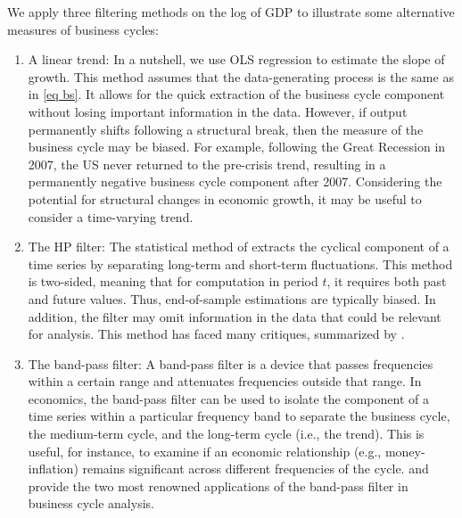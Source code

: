 \documentclass[a4paper,12pt]{article}%
\begin{document}
%


We apply three filtering methods on the log of GDP to illustrate some
alternative measures of business cycles:

\begin{enumerate}
\item \textsf{A linear trend:} In a nutshell, we use OLS regression to
estimate the slope of growth. This method assumes that the data-generating
process is the same as in \autoref{eq bs}. It allows for the quick extraction
of the business cycle component without losing important information in the
data. However, if output permanently shifts following a structural break,
then the measure of the business cycle may be biased. For example, following
the Great Recession in 2007, the US never returned to the pre-crisis trend,
resulting in a permanently negative business cycle component after 2007.
Considering the potential for structural changes in economic growth, it may
be useful to consider a time-varying trend.

\item \textsf{The HP filter:} The statistical method of
\cite{hodrick1997postwar} extracts the cyclical component of a time series by
separating long-term and short-term fluctuations. This method is two-sided,
meaning that for computation in period \( t \), it requires both past and
future values. Thus, end-of-sample estimations are typically biased. In
addition, the filter may omit information in the data that could be relevant
for analysis. This method has faced many critiques, summarized by
\cite{hamilton2018you}.

\item \textsf{The band-pass filter:} A band-pass filter is a device that
passes frequencies within a certain range and attenuates frequencies outside
that range. In economics, the band-pass filter can be used to isolate the
component of a time series within a particular frequency band to separate the
business cycle, the medium-term cycle, and the long-term cycle (i.e., the
trend). This is useful, for instance, to examine if an economic relationship
(e.g., money-inflation) remains significant across different frequencies of
the cycle. \cite{baxter1999measuring} and \cite{christiano2003band} provide
the two most renowned applications of the band-pass filter in business cycle
analysis.
\end{enumerate}


%
\end{document}

